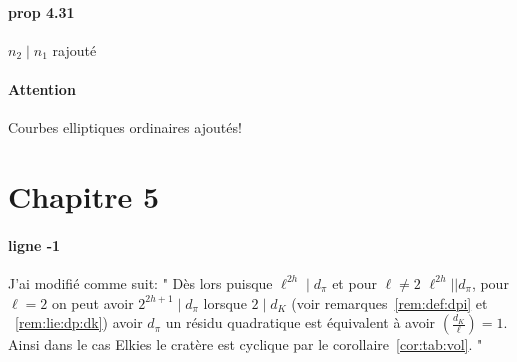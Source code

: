 \documentclass[10pt,a4paper]{article}
\theoremstyle{plain}
\theoremstyle{definition}
\theoremstyle{definition}
\theoremstyle{definition}
\theoremstyle{definition}
\theoremstyle{definition}
\theoremstyle{remark}
\theoremstyle{remark}
\theoremstyle{definition}
\begin{document}
\paragraph{prop 4.31}{$n_2 \mid n_1$ rajouté}

\paragraph{Attention}{Courbes elliptiques ordinaires ajoutés!}

\section{Chapitre 5}

\paragraph{ligne -1}{J'ai modifié comme suit: "
Dès lors puisque $\ell^{2h} \mid d_{\pi}$ et pour $\ell \neq 2$ $\ell^{2h}
|| d_{\pi}$, pour $\ell=2$ on peut avoir $2^{2h+1} \mid d_{\pi}$ lorsque $2 \mid d_K$ (voir remarques~\ref{rem:def:dpi} 
et ~\ref{rem:lie:dp:dk}) avoir $d_{\pi}$ un résidu quadratique est équivalent 
à avoir $\left( \frac{d_{K}}{\ell} \right)=1$. Ainsi dans le cas Elkies le 
cratère est cyclique par le corollaire~\ref{cor:tab:vol}.
"}
\end{document}
